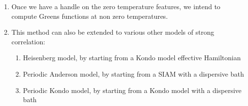 \documentclass{report}
\numberwithin{equation}{section}
\begin{document}
\begin{enumerate}
\item Once we have a handle on the zero temperature features, we intend to compute Greens functions at non zero temperatures.

\item This method can also be extended to various other models of strong correlation:
	\begin{enumerate}
		\item Heisenberg model, by starting from a Kondo model effective Hamiltonian
		\item Periodic Anderson model, by starting from a SIAM with a dispersive bath
		\item Periodic Kondo model, by starting from a Kondo model with a dispersive bath
	\end{enumerate}
\end{enumerate}
\end{document}
